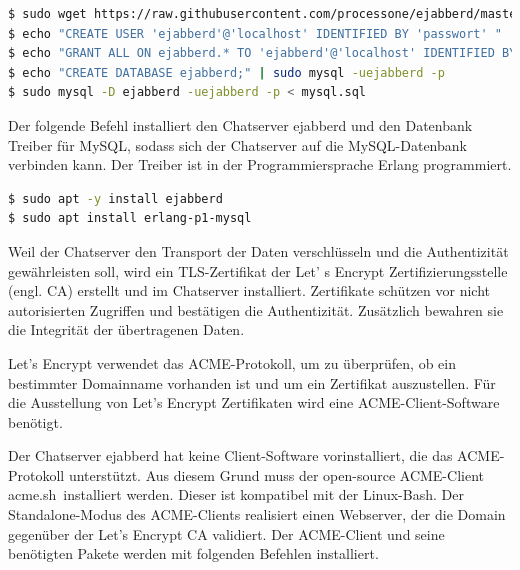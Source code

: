 \documentclass[a4paper,titlepage,halfparskip,12pt]{scrreprt}
\begin{document}
\begin{onehalfspacing}
\bigskip

 \begin{lstlisting}[language=bash, caption={Installation der Mysql-Datenbank}]
$ sudo wget https://raw.githubusercontent.com/processone/ejabberd/master/sql/mysql.sql
$ echo "CREATE USER 'ejabberd'@'localhost' IDENTIFIED BY 'passwort' " | sudo mysql -uroot
$ echo "GRANT ALL ON ejabberd.* TO 'ejabberd'@'localhost' IDENTIFIED BY 'passwort';" | sudo mysql -uroot
$ echo "CREATE DATABASE ejabberd;" | sudo mysql -uejabberd -p
$ sudo mysql -D ejabberd -uejabberd -p < mysql.sql
\end{lstlisting}



Der folgende Befehl installiert den Chatserver ejabberd und den Datenbank Treiber für MySQL, sodass sich der Chatserver auf die MySQL-Datenbank verbinden kann. Der Treiber ist in der Programmiersprache Erlang programmiert.

\bigskip

\begin{lstlisting}[language=bash, caption={Installation von ejabberd und des MySQL Datenbanktreibers}]
$ sudo apt -y install ejabberd
$ sudo apt install erlang-p1-mysql
\end{lstlisting}

Weil der Chatserver den Transport der Daten verschlüsseln und die Authentizität gewährleisten soll, wird ein TLS-Zertifikat der Let' s Encrypt Zertifizierungsstelle (engl. \ac{CA}) erstellt und im Chatserver installiert. Zertifikate schützen vor nicht autorisierten Zugriffen und bestätigen die Authentizität. Zusätzlich bewahren sie die Integrität der übertragenen Daten.\cite{melzer2010web}

Let's Encrypt verwendet das ACME-Protokoll, um zu überprüfen, ob ein bestimmter Domainname vorhanden ist und um ein Zertifikat auszustellen. Für die Ausstellung von Let's Encrypt Zertifikaten wird eine ACME-Client-Software benötigt.\cite{letsencryptACME}

Der Chatserver ejabberd hat keine Client-Software vorinstalliert, die das ACME-Protokoll unterstützt. Aus diesem Grund muss der open-source ACME-Client \glqq acme.sh\grqq\ installiert werden. Dieser ist kompatibel mit der Linux-Bash. Der Standalone-Modus des ACME-Clients realisiert einen Webserver, der die Domain gegenüber der Let's Encrypt \ac{CA} validiert.\cite{acmeshOfficial}
Der ACME-Client und seine benötigten Pakete werden mit folgenden Befehlen installiert.

\bigskip


\end{onehalfspacing}
\end{document}
